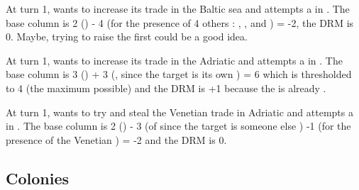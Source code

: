 \begin{exemple}
  At turn 1, \ANG wants to increase its trade in the Baltic sea and attempts a
  \TFI in . The base column is 2 (\FTI) - 4 (for the presence of
  4 others \TradeFLEET : \paysHollande, \paysDanemark, \paysHanse and
  \paysSuede) = -2, the DRM is 0. Maybe, trying to raise the \FTI first could
  be a good idea.

  At turn 1, \VEN wants to increase its trade in the Adriatic and attempts a
  \TFI in . The base column is 3 (\FTI) + 3 (\DTI, since the
  target is its own \CTZ) = 6 which is thresholded to 4 (the maximum possible)
  and the DRM is +1 because the \TradeFLEET is already \Faceplus.

  At turn 1, \TUR wants to try and steal the Venetian trade in Adriatic and
  attempts a \TFI in . The base column is 2 (\FTI) - 3 (\DTI of
  \VEN since the target is someone else \CTZ) -1 (for the presence of the
  Venetian \TradeFLEET) = -2 and the DRM is 0.
\end{exemple}



\subsection{Colonies}


